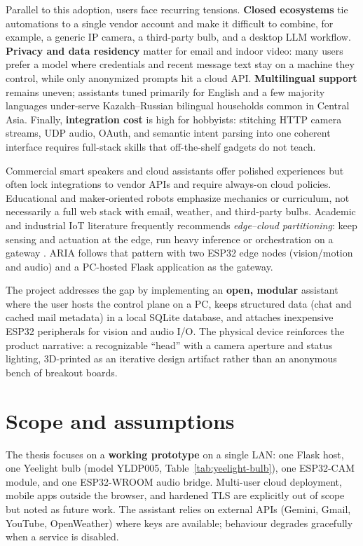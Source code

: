 \documentclass[12pt,a4paper]{report}
\begin{document}
Parallel to this adoption, users face recurring tensions. \textbf{Closed ecosystems} tie automations to a single vendor account and make it difficult to combine, for example, a generic IP camera, a third-party bulb, and a desktop LLM workflow. \textbf{Privacy and data residency} matter for email and indoor video: many users prefer a model where credentials and recent message text stay on a machine they control, while only anonymized prompts hit a cloud API. \textbf{Multilingual support} remains uneven; assistants tuned primarily for English and a few majority languages under-serve Kazakh--Russian bilingual households common in Central Asia. Finally, \textbf{integration cost} is high for hobbyists: stitching HTTP camera streams, UDP audio, OAuth, and semantic intent parsing into one coherent interface requires full-stack skills that off-the-shelf gadgets do not teach.

Commercial smart speakers and cloud assistants offer polished experiences but often lock integrations to vendor APIs and require always-on cloud policies. Educational and maker-oriented robots emphasize mechanics or curriculum, not necessarily a full web stack with email, weather, and third-party bulbs. Academic and industrial IoT literature frequently recommends \textit{edge--cloud partitioning}: keep sensing and actuation at the edge, run heavy inference or orchestration on a gateway \cite{esp-idf}. ARIA follows that pattern with two ESP32 edge nodes (vision/motion and audio) and a PC-hosted Flask application as the gateway.

The project addresses the gap by implementing an \textbf{open, modular} assistant where the user hosts the control plane on a PC, keeps structured data (chat and cached mail metadata) in a local SQLite database, and attaches inexpensive ESP32 peripherals for vision and audio I/O. The physical device reinforces the product narrative: a recognizable ``head'' with a camera aperture and status lighting, 3D-printed as an iterative design artifact rather than an anonymous bench of breakout boards.

\section{Scope and assumptions}

The thesis focuses on a \textbf{working prototype} on a single LAN: one Flask host, one Yeelight bulb (model YLDP005, Table~\ref{tab:yeelight-bulb}), one ESP32-CAM module, and one ESP32-WROOM audio bridge. Multi-user cloud deployment, mobile apps outside the browser, and hardened TLS are explicitly out of scope but noted as future work. The assistant relies on external APIs (Gemini, Gmail, YouTube, OpenWeather) where keys are available; behaviour degrades gracefully when a service is disabled.
\end{document}
